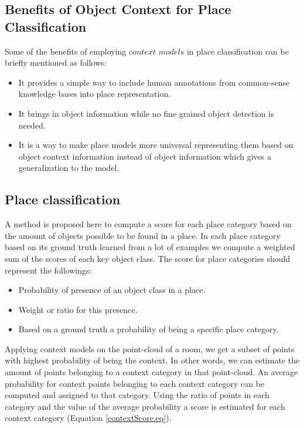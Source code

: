 \subsection{Benefits of Object Context for Place Classification}
\label{BenefitsofObjectContextforPlaceClassification.sec}
Some of the benefits of employing $context$ $models$ in place classification can be briefly mentioned as follows: 
\begin{itemize}
 \item It provides a simple way to include human annotations from common-sense knowledge bases into place 
 representation.
 \item It brings in object information while no fine grained object detection is needed.
 \item It is a way to make place models more universal representing them based on object context information instead
 of object information which gives a generalization to the model.
 
\end{itemize}


\subsection{Place classification}
\label{Place classification.sec}
A method is proposed here to compute a score for each place category based on the amount of objects possible to be
found in a place. 
In each place category based on its ground truth learned from a lot of examples we compute a weighted sum of the 
scores of each key object class.
The score for place categories should represent the followings:

\begin{itemize}
 \item Probability of presence of an object class in a place.
 \item Weight or ratio for this presence.
 \item Based on a ground truth a probability of being a specific place category.
\end{itemize}

Applying context models on the point-cloud of a room, we get a subset of points with highest probability of being 
the context. 
In other words, we can estimate the amount of points belonging to a context category in that point-cloud.
An average probability for context points belonging to each context category can be computed and assigned to that category.
Using the ratio of points in each category and the value of the average probability a score is estimated for each context
category (Equation \ref{contextScore.eq}).

